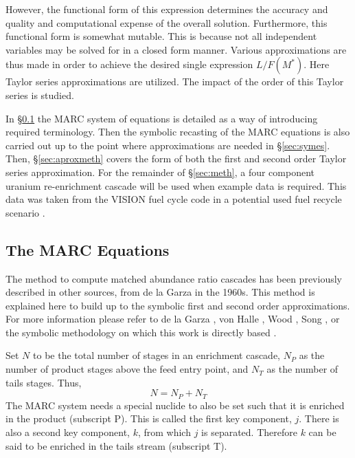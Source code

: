 \documentclass{ansconf}
\begin{document}
However, the functional form of this expression determines the accuracy and 
quality and computational expense of the overall solution.   Furthermore, this 
functional form is somewhat mutable.  This is because not all independent variables
may be solved for in a closed form manner.    Various approximations are thus made 
in order to achieve the desired single expression  $L/F(M^*)$.  Here Taylor
series approximations are utilized.  The impact of the order of this Taylor series
is studied.

In \S \ref{sec:marceq} the MARC system of equations is detailed as a way 
of introducing required terminology. 
Then the symbolic recasting of the MARC equations is also carried out up to the
point where approximations are needed in 
\S \ref{sec:symes}.  Then, \S \ref{sec:aproxmeth} covers the form of both 
the first and second order Taylor series approximation.
For the remainder of \S \ref{sec:meth}, a four component uranium re-enrichment 
cascade will be used when example data is required.  This data was taken from the
VISION fuel cycle code in a potential used fuel recycle scenario \cite{Jacobson2009}.

\subsection{The MARC Equations}
\label{sec:marceq}

The method to compute matched abundance ratio cascades has been 
previously described in other sources, from de la Garza in the
1960s. This method is explained here to build up to the symbolic first and 
second order approximations.
For more information please refer to de la Garza
\cite{DelaGarza1969}, von Halle \cite{VonHalle1987}, Wood \cite{Wood1999}, 
Song \cite{doi:10.1080/01496391003793884}, or the symbolic methodology on which this 
work is directly based \cite{Scopatz2012}.

Set $N$ to be the total number of stages in an enrichment cascade, $N_P$ as the 
number of 
product stages above the feed entry point, and $N_T$ as the number of tails
stages.  Thus,
\begin{equation}
N = N_P + N_T
\end{equation}
The MARC system needs a special nuclide to also be set such that it is enriched in the 
product (subscript P).  This is called the first key component, $j$.  
There is also a second key component, $k$, from which $j$ is 
separated. Therefore $k$ can be said to be enriched in the tails stream (subscript T).
\end{document}
